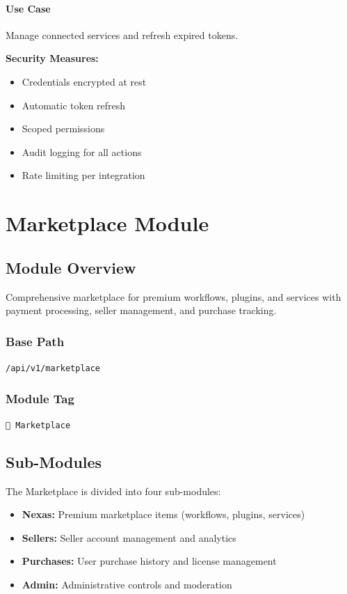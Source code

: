 \documentclass[11pt,a4paper]{report}
\begin{document}
\subsubsection{Use Case}
Manage connected services and refresh expired tokens.

\begin{infobox}
\textbf{Security Measures:}
\begin{itemize}[leftmargin=*]
    \item Credentials encrypted at rest
    \item Automatic token refresh
    \item Scoped permissions
    \item Audit logging for all actions
    \item Rate limiting per integration
\end{itemize}
\end{infobox}

\newpage

\chapter{Marketplace Module}

\section{Module Overview}

Comprehensive marketplace for premium workflows, plugins, and services with payment processing, seller management, and purchase tracking.

\subsection{Base Path}
\texttt{/api/v1/marketplace}

\subsection{Module Tag}
\texttt{🏪 Marketplace}

\section{Sub-Modules}

The Marketplace is divided into four sub-modules:

\begin{itemize}[leftmargin=*]
    \item \textbf{Nexas:} Premium marketplace items (workflows, plugins, services)
    \item \textbf{Sellers:} Seller account management and analytics
    \item \textbf{Purchases:} User purchase history and license management
    \item \textbf{Admin:} Administrative controls and moderation
\end{itemize}
\end{document}
